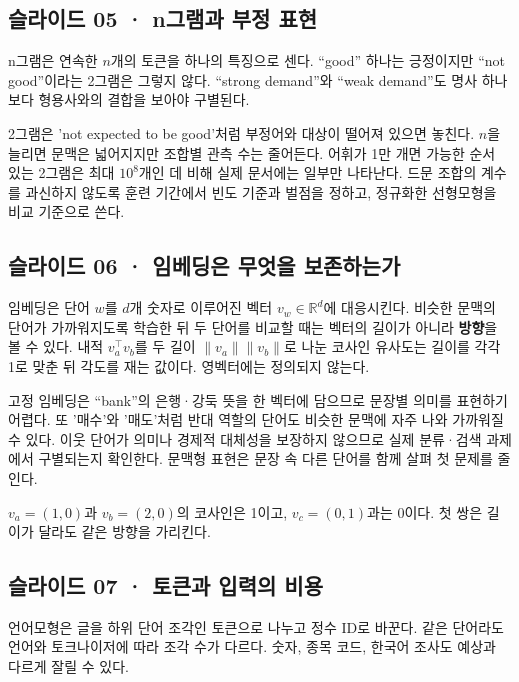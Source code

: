 \documentclass[11pt,a4paper]{article}
\begin{document}
\subsection{슬라이드 05 · n그램과 부정 표현}
n그램은 연속한 $n$개의 토큰을 하나의 특징으로 센다. “good” 하나는 긍정이지만 “not good”이라는 2그램은 그렇지 않다. “strong demand”와 “weak demand”도 명사 하나보다 형용사와의 결합을 보아야 구별된다.\par

2그램은 'not expected to be good'처럼 부정어와 대상이 떨어져 있으면 놓친다. $n$을 늘리면 문맥은 넓어지지만 조합별 관측 수는 줄어든다. 어휘가 1만 개면 가능한 순서 있는 2그램은 최대 $10^8$개인 데 비해 실제 문서에는 일부만 나타난다. 드문 조합의 계수를 과신하지 않도록 훈련 기간에서 빈도 기준과 벌점을 정하고, 정규화한 선형모형을 비교 기준으로 쓴다.\par

\subsection{슬라이드 06 · 임베딩은 무엇을 보존하는가}
임베딩은 단어 $w$를 $d$개 숫자로 이루어진 벡터 $v_w\in\mathbb R^d$에 대응시킨다. 비슷한 문맥의 단어가 가까워지도록 학습한 뒤 두 단어를 비교할 때는 벡터의 길이가 아니라 \textbf{방향}을 볼 수 있다. 내적 $v_a^\top v_b$를 두 길이 $\|v_a\|\|v_b\|$로 나눈 코사인 유사도는 길이를 각각 1로 맞춘 뒤 각도를 재는 값이다. 영벡터에는 정의되지 않는다.\par

고정 임베딩은 “bank”의 은행·강둑 뜻을 한 벡터에 담으므로 문장별 의미를 표현하기 어렵다. 또 '매수'와 '매도'처럼 반대 역할의 단어도 비슷한 문맥에 자주 나와 가까워질 수 있다. 이웃 단어가 의미나 경제적 대체성을 보장하지 않으므로 실제 분류·검색 과제에서 구별되는지 확인한다. 문맥형 표현은 문장 속 다른 단어를 함께 살펴 첫 문제를 줄인다.\par

$v_a=(1,0)$과 $v_b=(2,0)$의 코사인은 1이고, $v_c=(0,1)$과는 0이다. 첫 쌍은 길이가 달라도 같은 방향을 가리킨다.\par

\subsection{슬라이드 07 · 토큰과 입력의 비용}
언어모형은 글을 하위 단어 조각인 토큰으로 나누고 정수 ID로 바꾼다. 같은 단어라도 언어와 토크나이저에 따라 조각 수가 다르다. 숫자, 종목 코드, 한국어 조사도 예상과 다르게 잘릴 수 있다.\par
\end{document}
